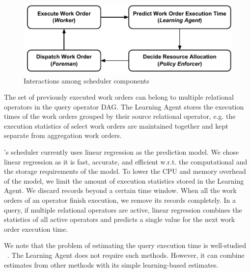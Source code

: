 \begin{figure}[h]
	\centering
	\includegraphics[width=\linewidth]{figures/Compact-SchedulerCycle.pdf}
	\vspace{-2em}
	\caption{Interactions among scheduler components}
	\label{fig:scheduler-cycle}
\end{figure}

The set of previously executed work orders can belong to multiple relational operators in the query operator DAG. 
The Learning Agent stores the execution times of the work orders grouped by their source relational operator, e.g. the execution statistics of select work orders are maintained together and kept separate from aggregation work orders. 

\sys{}'s scheduler currently uses linear regression as the prediction model.
We chose linear regression as it is fast, accurate, and efficient w.r.t. the computational and the storage requirements of the model. 
To lower the CPU and memory overhead of the model, we limit the amount of execution statistics stored in the Learning Agent.
We discard records beyond a certain time window. 
When all the work orders of an operator finish execution, we remove its records completely. 
In a query, if multiple relational operators are active, linear regression combines the statistics of all active operators and predicts a single value for the next work order execution time.

We note that the problem of estimating the query execution time is well-studied 
~\cite{duggan2011performance, wu2013towards, li2012gslpi, 
chaudhuri2004estimating}. 
The Learning Agent does not require such methods. 
However, it can combine estimates from other methods with its simple learning-based estimates.
